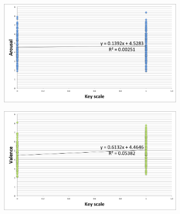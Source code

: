 \begin{figure}
	    \centering
        \begin{subfigure}[b]{0.48\textwidth}
                \includegraphics[width=\textwidth]{Figures/keyscale-arousal}
			   \vspace{20pt}
        \end{subfigure}
        \begin{subfigure}[b]{0.48\textwidth}
                \includegraphics[width=\textwidth]{Figures/keyscale-valence}
                  \vspace{20pt}
        \end{subfigure}        
        

\end{figure}

